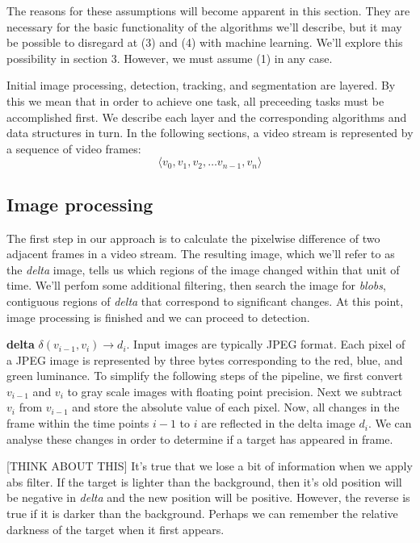 \documentclass[letter]{article}
\begin{document}
The reasons for these assumptions will become apparent in this section. They are 
necessary for the basic functionality of the algorithms we'll describe, but it may
be possible to disregard at (3) and (4) with machine learning. We'll explore this 
possibility in section 3. However, we must assume (1) in any case. 

Initial image processing, detection, tracking, and segmentation are layered. By this 
we mean that in order to achieve one task, all preceeding tasks must be accomplished first. 
We describe each layer and the corresponding algorithms and data structures in turn. 
In the following sections, a video stream is represented by a sequence of video frames:
$$ \langle v_0, v_1, v_2, \dots v_{n-1}, v_n \rangle $$

\subsection{Image processing}
The first step in our approach is to calculate the pixelwise difference of two
adjacent frames in a video stream. The resulting image, which we'll refer to as
the \textit{delta} image, tells us which regions of the image changed within that 
unit of time. We'll perfom some additional filtering, then search the image for 
\textit{blobs}, contiguous regions of \textit{delta} that correspond to significant 
changes. At this point, image processing is finished and we can proceed to detection. 


 \textbf{delta} $\delta(v_{i-1}, v_i) \rightarrow d_i$. Input images are typically JPEG 
format. Each pixel of a JPEG image is represented by three bytes corresponding 
to the red, blue, and green luminance. To simplify the following steps of the 
pipeline, we first convert $v_{i-1}$ and $v_i$ to gray scale images with floating point 
precision. Next we subtract 
$v_{i}$ from $v_{i-1}$ and store the absolute value of each pixel. Now, all changes in 
the frame within the time points $i-1$ to $i$ are reflected in the delta image $d_i$. 
We can analyse these changes in order to determine if a target has appeared in frame.

[THINK ABOUT THIS] It's true that we lose a bit of information when we apply abs 
filter. If the target is lighter than the background, then it's old position will be 
negative in \textit{delta} and the new position will be positive. However, the reverse
is true if it is darker than the background. Perhaps we can remember the relative 
darkness of the target when it first appears. 
\end{document}
